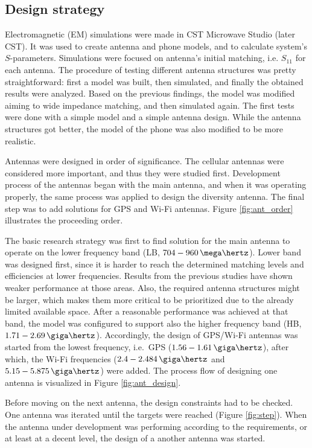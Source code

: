 \subsection{Design strategy}
\label{sec:process}
Electromagnetic (EM) simulations were made in CST Microwave Studio \cite{cst} (later CST). It was used to create antenna and phone models, and to calculate system's $S$-parameters. Simulations were focused on antenna's initial matching, i.e. $S_{11}$ for each antenna. The procedure of testing different antenna structures was pretty straightforward: first a model was built, then simulated, and finally the obtained results were analyzed. Based on the previous findings, the model was modified aiming to wide impedance matching, and then simulated again. The first tests were done with a simple model and a simple antenna design. While the antenna structures got better, the model of the phone was also modified to be more realistic.

Antennas were designed in order of significance. The cellular antennas were considered more important, and thus they were studied first. Development process of the antennas began with the main antenna, and when it was operating properly, the same process was applied to design the diversity antenna. The final step was to add solutions for GPS and Wi-Fi antennas. Figure \ref{fig:ant_order} illustrates the proceeding order. 

The basic research strategy was first to find solution for the main antenna to operate on the lower frequency band (LB, $704-960\,\mega\hertz$). Lower band was designed first, since it is harder to reach the determined matching levels and efficiencies at lower frequencies. Results from the previous studies have shown weaker performance at those areas. Also, the required antenna structures might be larger, which makes them more critical to be prioritized due to the already limited available space. After a reasonable performance was achieved at that band, the model was configured to support also the higher frequency band (HB, $1.71-2.69\,\giga\hertz$). Accordingly, the design of GPS/Wi-Fi antennas was started from the lowest frequency, i.e.\ GPS ($1.56-1.61\,\giga\hertz$), after which, the Wi-Fi frequencies ($2.4-2.484\,\giga\hertz$ and $5.15-5.875\,\giga\hertz$) were added. The process flow of designing one antenna is visualized in Figure \ref{fig:ant_design}.

Before moving on the next antenna, the design constraints had to be checked. One antenna was iterated until the targets were reached (Figure \ref{fig:step}). When the antenna under development was performing according to the requirements, or at least at a decent level, the design of a another antenna was started.

